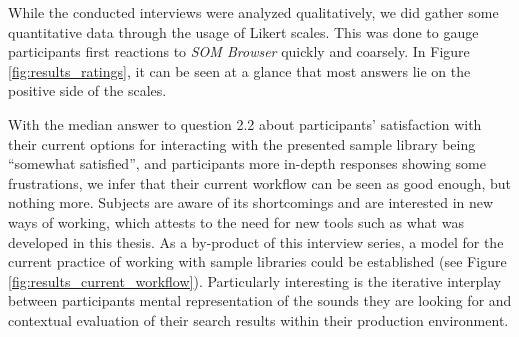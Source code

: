 While the conducted interviews were analyzed qualitatively, we did gather some
quantitative data through the usage of Likert scales. This was done to gauge
participants first reactions to \textit{SOM Browser} quickly and coarsely.
In Figure \ref{fig:results_ratings}, it can be seen at a glance that most
answers lie on the positive side of the scales.

\smallskip

With the median answer to question 2.2 about participants' satisfaction with
their current options for interacting with the presented sample library being
``somewhat satisfied'', and participants more in-depth responses showing some
frustrations, we infer that their current workflow can be seen as good enough,
but nothing more. Subjects are aware of its shortcomings and are interested in
new ways of working, which attests to the need for new tools such as what was
developed in this thesis. As a by-product of this interview series, a model for
the current practice of working with sample libraries could be established (see
Figure \ref{fig:results_current_workflow}). Particularly interesting is the
iterative interplay between participants mental representation of the sounds
they are looking for and contextual evaluation of their search results within
their production environment.

\smallskip

